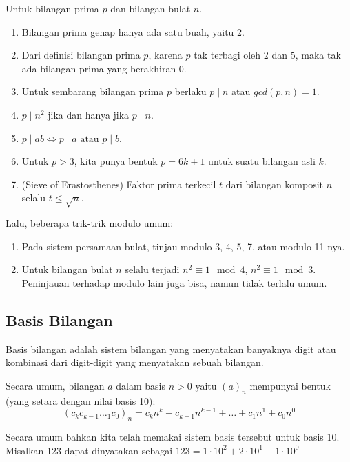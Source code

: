     Untuk bilangan prima $p$ dan bilangan bulat $n$.
    \begin{enumerate}
        \item Bilangan prima genap hanya ada satu buah, yaitu 2.
        \item Dari definisi bilangan prima $p$, karena $p$ tak terbagi oleh $2$ dan $5$, maka tak ada bilangan prima yang berakhiran $0$.
        \item Untuk sembarang bilangan prima $p$ berlaku $p \mid n$ atau $gcd(p,n)=1$.
        \item $p \mid n^2$ jika dan hanya jika $p \mid n$.
        \item $p \mid ab \iff p \mid a \text{ atau } p \mid b$.
        \item Untuk $p > 3$, kita punya bentuk $p = 6k \pm 1$ untuk suatu bilangan asli $k$.
        \item (Sieve of Erastosthenes) 
        Faktor prima terkecil $t$ dari bilangan komposit $n$ selalu $t \le \sqrt{n}$.
        \end{enumerate}
        
    Lalu, beberapa trik-trik modulo umum:
    \begin{enumerate}
        \item Pada sistem persamaan bulat, tinjau modulo 3, 4, 5, 7, atau modulo 11 nya.
        \item Untuk bilangan bulat $n$ selalu terjadi $n^2 \equiv 1 \mod 4$, $n^2 \equiv 1 \mod 3$. Peninjauan terhadap modulo lain juga bisa, namun tidak terlalu umum.
    \end{enumerate}
    
    \subsection{Basis Bilangan}
    Basis bilangan adalah sistem bilangan yang menyatakan banyaknya digit atau kombinasi dari digit-digit yang menyatakan sebuah bilangan.
    
    Secara umum, bilangan $a$ dalam basis $n > 0$ yaitu $(a)_n$ mempunyai bentuk (yang setara dengan nilai basis 10):
    $$(c_kc_{k-1}\dotsc_1c_0)_n = c_{k}n^k + c_{k-1}n^{k-1}+\dots+c_1n^{1}+c_0n^{0}$$
    
    Secara umum bahkan kita telah memakai sistem basis tersebut untuk basis 10. Misalkan 123 dapat dinyatakan sebagai $123 = 1\cdot 10^2 + 2\cdot 10^1 + 1\cdot 10^0$
    

